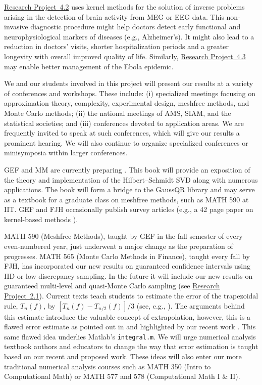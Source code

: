\documentclass[11pt]{NSFamsart}
\newcommand{\Matlab}{{\sc Matlab}\xspace}
\newcommand{\refprobba}{\hyperref[Integrationsubsec]{Research Project~2.1}\xspace}
\newcommand{\refprobdb}{\hyperref[SectMEEG]{Research Project~4.2}\xspace}
\newcommand{\refprobdc}{\hyperref[ebolasubsec]{Research Project~4.3}\xspace}
\begin{document}
\begin{description}[leftmargin=0ex]
\item[Promoting the Well-being of the Broader Society]
\refprobdb uses kernel methods for the solution of inverse problems arising in the detection of brain activity from MEG or EEG data. This non-invasive diagnostic procedure might help doctors detect early functional and neurophysiological markers of diseases (e.g., Alzheimer's). It might also lead to a reduction in doctors' visits, shorter hospitalization periods and a greater longevity with overall improved quality of life. Similarly, \refprobdc may enable better management of the Ebola epidemic.

\item[Organizing and Presenting at Conferences]
We and our students involved in this project will present our results at a variety of conferences and workshops.  These include: (i) specialized meetings focusing on approximation theory, complexity, experimental design, meshfree methods, and Monte Carlo methods; (ii) the national meetings of AMS, SIAM, and the statistical societies; and (iii) conferences devoted to application areas.  We are frequently invited to speak at such conferences, which will give our results a prominent hearing. We will also continue to organize specialized conferences or minisymposia within larger conferences.

\item[Writing Textbooks and Survey Papers]
GEF and MM are currently preparing \citep{FMcC15}. This book will provide an exposition of the theory and implementation of the Hilbert--Schmidt SVD along with numerous applications. The book will form a bridge to the GaussQR library \citep{McCFBG13} and may serve as a textbook for a graduate class on meshfree methods, such as MATH 590 at IIT. GEF and FJH occasionally publish survey articles (e.g., a 42 page paper on kernel-based methods \citep{Fasshauer11}).

\item[Refreshing Course Syllabi]
MATH 590 (Meshfree Methods), taught by GEF in the fall semester of every even-numbered year, just underwent a major change as the preparation of \citep{FMcC15} progresses.
MATH 565 (Monte Carlo Methods in Finance), taught every fall by FJH, has incorporated our new results on guaranteed confidence intervals using IID or low discrepancy sampling. In the future it will include our new results on guaranteed multi-level and quasi-Monte Carlo sampling (see \refprobba).
Current texts teach students to estimate the error of the trapezoidal rule, $T_n(f)$, by $[T_n(f)-T_{n/2}(f)]/3$ (see, e.g., \cite[pp.\ 223--224]{BurFai10}).  The arguments behind this estimate introduce the valuable concept of extrapolation, however, this is a flawed error estimate as pointed out in \cite{Lyn83} and highlighted by our recent work \cite{HicEtal14b}.  This same flawed idea underlies \Matlab's {\tt integral.m}.  We will urge numerical analysis textbook authors and educators to change the way that error estimation is taught based on our recent and proposed work.  These ideas will also enter our more traditional numerical analysis courses such as MATH 350 (Intro to Computational Math) or MATH 577 and 578 (Computational Math I \& II).


\end{description}
\end{document}
